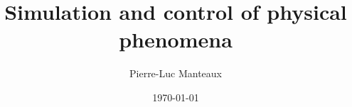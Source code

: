 \documentclass[11pt, oneside, a4paper]{memoir}
\begin{document}
\title{Simulation and control of physical phenomena}
\author{Pierre-Luc Manteaux}
\date{\today}
\maketitle

\frontmatter



\tableofcontents

\mainmatter
%

%
%
%
%
%


\backmatter
\printbibliography
\listoffigures
\listofalgorithms
\listoftables
\end{document}
